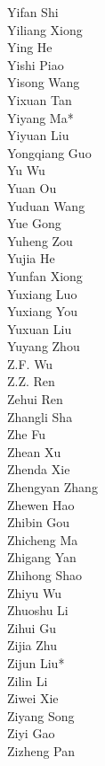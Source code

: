 \documentclass[11pt, a4paper, logo, copyright, nonumbering]{deepseek}
\begin{document}
\begin{CJK*}{UTF8}{gbsn}
\begin{multicols}{2}
\color{damaiblue} Yifan Shi \\
\color{damaiblue} Yiliang Xiong \\
\color{damaiblue} Ying He \\
\color{damaiblue} Yishi Piao \\
\color{damaiblue} Yisong Wang \\
\color{damaiblue} Yixuan Tan \\
\color{damaiblue} Yiyang Ma* \\
\color{damaiblue} Yiyuan Liu \\
\color{damaiblue} Yongqiang Guo \\
\color{damaiblue} Yu Wu \\
\color{damaiblue} Yuan Ou \\
\color{damaiblue} Yuduan Wang \\
\color{damaiblue} Yue Gong \\
\color{damaiblue} Yuheng Zou \\
\color{damaiblue} Yujia He \\
\color{damaiblue} Yunfan Xiong \\
\color{damaiblue} Yuxiang Luo \\
\color{damaiblue} Yuxiang You \\
\color{damaiblue} Yuxuan Liu \\
\color{damaiblue} Yuyang Zhou \\
\color{damaiblue} Z.F. Wu \\
\color{damaiblue} Z.Z. Ren \\
\color{damaiblue} Zehui Ren \\
\color{damaiblue} Zhangli Sha \\
\color{damaiblue} Zhe Fu \\
\color{damaiblue} Zhean Xu \\
\color{damaiblue} Zhenda Xie \\
\color{damaiblue} Zhengyan Zhang \\
\color{damaiblue} Zhewen Hao \\
\color{damaiblue} Zhibin Gou \\
\color{damaiblue} Zhicheng Ma \\
\color{damaiblue} Zhigang Yan \\
\color{damaiblue} Zhihong Shao \\
\color{damaiblue} Zhiyu Wu \\
\color{damaiblue} Zhuoshu Li \\
\color{damaiblue} Zihui Gu \\
\color{damaiblue} Zijia Zhu \\
\color{damaiblue} Zijun Liu* \\
\color{damaiblue} Zilin Li \\
\color{damaiblue} Ziwei Xie \\
\color{damaiblue} Ziyang Song \\
\color{damaiblue} Ziyi Gao \\
\color{damaiblue} Zizheng Pan \\


\end{multicols}
\end{CJK*}
\end{document}
